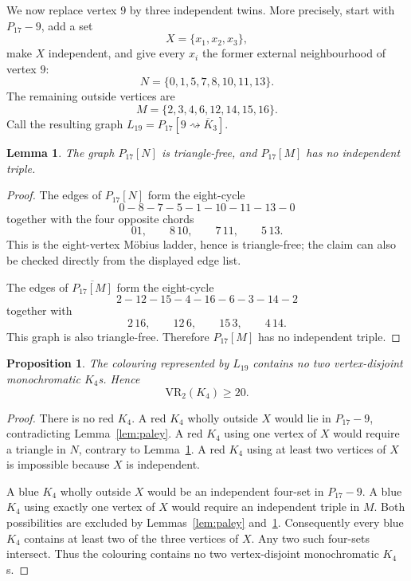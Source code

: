 \documentclass[11pt,a4paper]{article}
\newtheorem{lemma}[theorem]{Lemma}
\newtheorem{proposition}[theorem]{Proposition}
\theoremstyle{definition}
\theoremstyle{remark}
\begin{document}
We now replace vertex \(9\) by three independent twins.  More precisely,
start with \(P_{17}-9\), add a set
\[
  X=\{x_1,x_2,x_3\},
\]
make \(X\) independent, and give every \(x_i\) the former external
neighbourhood of vertex \(9\):
\[
  N=\{0,1,5,7,8,10,11,13\}.
\]
The remaining outside vertices are
\[
  M=\{2,3,4,6,12,14,15,16\}.
\]
Call the resulting graph \(L_{19}=P_{17}[9\rightsquigarrow\overline K_3]\).

\begin{lemma}\label{lem:local-paley}
The graph \(P_{17}[N]\) is triangle-free, and \(P_{17}[M]\) has no
independent triple.
\end{lemma}

\begin{proof}
The edges of \(P_{17}[N]\) form the eight-cycle
\[
  0-8-7-5-1-10-11-13-0
\]
together with the four opposite chords
\[
  01,\qquad 8\,10,\qquad 7\,11,\qquad 5\,13.
\]
This is the eight-vertex M\"obius ladder, hence is triangle-free; the
claim can also be checked directly from the displayed edge list.

The edges of \(\overline{P_{17}[M]}\) form the eight-cycle
\[
  2-12-15-4-16-6-3-14-2
\]
together with
\[
  2\,16,\qquad 12\,6,\qquad 15\,3,\qquad 4\,14.
\]
This graph is also triangle-free.  Therefore \(P_{17}[M]\) has no
independent triple.
\end{proof}

\begin{proposition}\label{prop:lower}
The colouring represented by \(L_{19}\) contains no two
vertex-disjoint monochromatic \(K_4\)s.  Hence
\[
  \mathrm{VR}_2(K_4)\geq20.
\]
\end{proposition}

\begin{proof}
There is no red \(K_4\).  A red \(K_4\) wholly outside \(X\) would lie in
\(P_{17}-9\), contradicting Lemma~\ref{lem:paley}.  A red \(K_4\) using one
vertex of \(X\) would require a triangle in \(N\), contrary to
Lemma~\ref{lem:local-paley}.  A red \(K_4\) using at least two vertices of
\(X\) is impossible because \(X\) is independent.

A blue \(K_4\) wholly outside \(X\) would be an independent four-set in
\(P_{17}-9\).  A blue \(K_4\) using exactly one vertex of \(X\) would
require an independent triple in \(M\).  Both possibilities are excluded
by Lemmas~\ref{lem:paley} and~\ref{lem:local-paley}.  Consequently every
blue \(K_4\)
contains at least two of the three vertices of \(X\).  Any two such
four-sets intersect.  Thus the colouring contains no two vertex-disjoint
monochromatic \(K_4\)s.
\end{proof}
\end{document}
